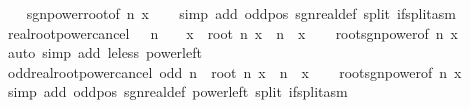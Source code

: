 \begin{isabellebody}
%
\isadelimproof
\ \ %
\endisadelimproof
%
\isatagproof
{}\isamarkupfalse%
\ sgn{\isacharunderscore}{\kern0pt}power{\isacharunderscore}{\kern0pt}root{\isacharbrackleft}{\kern0pt}of\ n\ x{\isacharbrackright}{\kern0pt}\isanewline
\ \ \isamarkupfalse%
\ {\isacharparenleft}{\kern0pt}simp\ add{\isacharcolon}{\kern0pt}\ odd{\isacharunderscore}{\kern0pt}pos\ sgn{\isacharunderscore}{\kern0pt}real{\isacharunderscore}{\kern0pt}def\ split{\isacharcolon}{\kern0pt}\ if{\isacharunderscore}{\kern0pt}split{\isacharunderscore}{\kern0pt}asm{\isacharparenright}{\kern0pt}%
\endisatagproof
{\isafoldproof}%
%
\isadelimproof
\isanewline
%
\endisadelimproof
\isanewline
{}\isamarkupfalse%
\ real{\isacharunderscore}{\kern0pt}root{\isacharunderscore}{\kern0pt}power{\isacharunderscore}{\kern0pt}cancel{\isacharcolon}{\kern0pt}\ {\isachardoublequoteopen}{}\ {\isacharless}{\kern0pt}\ n\ {\isasymLongrightarrow}\ {}\ {\isasymle}\ x\ {\isasymLongrightarrow}\ root\ n\ {\isacharparenleft}{\kern0pt}x\ {\isacharcircum}{\kern0pt}\ n{\isacharparenright}{\kern0pt}\ {\isacharequal}{\kern0pt}\ x{\isachardoublequoteclose}\isanewline
%
\isadelimproof
\ \ %
\endisadelimproof
%
\isatagproof
{}\isamarkupfalse%
\ root{\isacharunderscore}{\kern0pt}sgn{\isacharunderscore}{\kern0pt}power{\isacharbrackleft}{\kern0pt}of\ n\ x{\isacharbrackright}{\kern0pt}\ \isamarkupfalse%
\ {\isacharparenleft}{\kern0pt}auto\ simp\ add{\isacharcolon}{\kern0pt}\ le{\isacharunderscore}{\kern0pt}less\ power{\isacharunderscore}{\kern0pt}{}{\isacharunderscore}{\kern0pt}left{\isacharparenright}{\kern0pt}%
\endisatagproof
{\isafoldproof}%
%
\isadelimproof
\isanewline
%
\endisadelimproof
\isanewline
{}\isamarkupfalse%
\ odd{\isacharunderscore}{\kern0pt}real{\isacharunderscore}{\kern0pt}root{\isacharunderscore}{\kern0pt}power{\isacharunderscore}{\kern0pt}cancel{\isacharcolon}{\kern0pt}\ {\isachardoublequoteopen}odd\ n\ {\isasymLongrightarrow}\ root\ n\ {\isacharparenleft}{\kern0pt}x\ {\isacharcircum}{\kern0pt}\ n{\isacharparenright}{\kern0pt}\ {\isacharequal}{\kern0pt}\ x{\isachardoublequoteclose}\isanewline
%
\isadelimproof
\ \ %
\endisadelimproof
%
\isatagproof
{}\isamarkupfalse%
\ root{\isacharunderscore}{\kern0pt}sgn{\isacharunderscore}{\kern0pt}power{\isacharbrackleft}{\kern0pt}of\ n\ x{\isacharbrackright}{\kern0pt}\isanewline
\ \ \isamarkupfalse%
\ {\isacharparenleft}{\kern0pt}simp\ add{\isacharcolon}{\kern0pt}\ odd{\isacharunderscore}{\kern0pt}pos\ sgn{\isacharunderscore}{\kern0pt}real{\isacharunderscore}{\kern0pt}def\ power{\isacharunderscore}{\kern0pt}{}{\isacharunderscore}{\kern0pt}left\ split{\isacharcolon}{\kern0pt}\ if{\isacharunderscore}{\kern0pt}split{\isacharunderscore}{\kern0pt}asm{\isacharparenright}{\kern0pt}%

\end{isabellebody}
